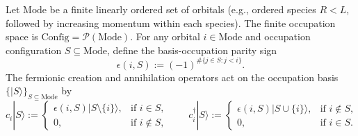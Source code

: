 Let $\text{Mode}$ be a finite linearly ordered set of orbitals (e.g., ordered species $R < L$,
followed by increasing momentum within each species).
The finite occupation space is $\text{Config} = \mathcal P(\text{Mode})$.
For any orbital $i \in \text{Mode}$ and occupation configuration $S \subseteq \text{Mode}$, define the
basis-occupation parity sign
\begin{equation}
 \epsilon(i, S) := (-1)^{\#\{j \in S : j < i\}}.
 \label{eq:ch20-jw-parity}
\end{equation}
The fermionic creation and annihilation operators act on the occupation basis $\{|S\rangle\}_{S \subseteq \text{Mode}}$ by
\begin{equation}
 c_i |S\rangle := \begin{cases}
  \epsilon(i, S) |S \setminus \{i\}\rangle, & \text{if } i \in S, \\
  0, & \text{if } i \notin S,
 \end{cases}
 \qquad
 c_i^\dagger |S\rangle := \begin{cases}
  \epsilon(i, S) |S \cup \{i\}\rangle, & \text{if } i \notin S, \\
  0, & \text{if } i \in S.
 \end{cases}
 \label{eq:ch20-basis-action}
\end{equation}

